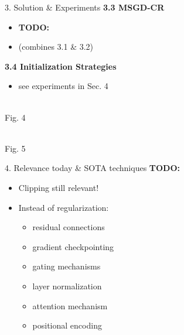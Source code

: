 \documentclass[final]{beamer}
\newcommand{\todo}[1]{\textcolor{myred}{\textbf{TODO:} #1}}
\begin{document}
\begin{frame}[t]
\begin{columns}[t,totalwidth=\textwidth]
\begin{column}{0.33\textwidth}
\begin{block}{3. Solution \& Experiments}
      \vspace{0.5em}
      \textbf{3.3 MSGD-CR}
        \begin{itemize}
            \item \todo{}
            \item  (combines 3.1 \& 3.2)
            
    \end{itemize}
  
      \vspace{0.5em}
      \textbf{3.4 Initialization Strategies}
      \begin{itemize}
        \item see experiments in Sec. 4
      \end{itemize}
  
      \vspace{1em}
      \begin{center}
        \\[0.3em]
        Fig. 4
      \end{center}

      \begin{center}
        \\[0.3em]
        Fig. 5
      \end{center}
  
    \end{block}
  
    \vspace{1em}
  
    \begin{block}{4. Relevance today \& SOTA techniques} \todo{}
      \begin{itemize}
        \item Clipping still relevant!
        \item Instead of regularization:
        \begin{itemize}
          \item residual connections
          \item gradient checkpointing
          \item gating mechanisms
          \item layer normalization
          \item attention mechanism
          \item positional encoding
        \end{itemize}
      \end{itemize}
    \end{block}
  \end{column}
  
  \end{columns}
\end{frame}
\end{document}
